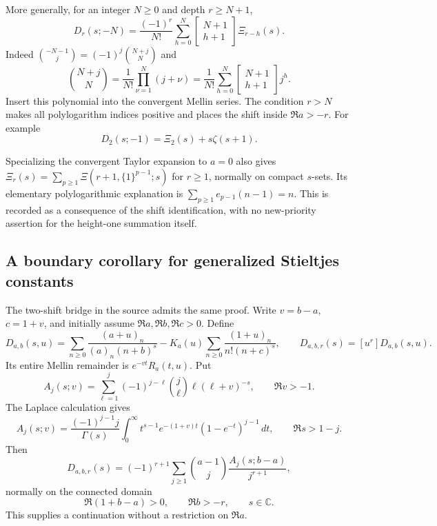 \documentclass[11pt,a4paper]{article}
\numberwithin{equation}{section}
\theoremstyle{definition}
\theoremstyle{remark}
\begin{document}
More generally, for an integer $N\ge0$ and depth $r\ge N+1$,
\begin{equation}\label{hn:eq:negative-shifts}
 D_r(s;-N)=\frac{(-1)^r}{N!}\sum_{h=0}^N
     \left[\begin{matrix}N+1\\h+1\end{matrix}\right]\Xi_{r-h}(s).
\end{equation}
Indeed $\binom{-N-1}{j}=(-1)^j\binom{N+j}{N}$ and
\[
 \binom{N+j}{N}=\frac1{N!}\prod_{\nu=1}^N(j+\nu)
   =\frac1{N!}\sum_{h=0}^N
       \left[\begin{matrix}N+1\\h+1\end{matrix}\right]j^h.
\]
Insert this polynomial into the convergent Mellin series. The
condition $r>N$ makes all polylogarithm indices positive and
places the shift inside $\Re a>-r$. For example
\[
                   D_2(s;-1)=\Xi_2(s)+s\zeta(s+1).
\]

Specializing the convergent Taylor expansion to $a=0$ also gives
$\Xi_r(s)=\sum_{p\ge1}\Xi(r+1,\{1\}^{p-1};s)$ for $r\ge1$,
normally on compact $s$-sets. Its elementary polylogarithmic
explanation is $\sum_{p\ge1}e_{p-1}(n-1)=n$.
This is recorded as a consequence of the shift identification,
with no new-priority assertion for the height-one summation itself.

\subsection{A boundary corollary for generalized Stieltjes constants}

The two-shift bridge in the source admits the same proof. Write
$v=b-a$, $c=1+v$, and initially assume $\Re a,\Re b,\Re c>0$.
Define
\[
 D_{a,b}(s,u)=\sum_{n\ge0}\frac{(a+u)_n}{(a)_n(n+b)^s}
   -K_a(u)\sum_{n\ge0}\frac{(1+u)_n}{n!(n+c)^s},
 \qquad D_{a,b,r}(s)=[u^r]D_{a,b}(s,u).
\]
Its entire Mellin remainder is $e^{-vt}R_a(t,u)$.
Put
\[
 A_j(s;v)=\sum_{\ell=1}^j(-1)^{j-\ell}\binom j\ell
                     \ell(\ell+v)^{-s},\qquad \Re v>-1.
\]
The Laplace calculation gives
\[
 A_j(s;v)=\frac{(-1)^{j-1}j}{\Gamma(s)}
       \int_0^\infty t^{s-1}e^{-(1+v)t}(1-e^{-t})^{j-1}\,dt,
 \qquad \Re s>1-j.
\]
Then
\begin{equation}\label{hn:eq:twodepth}
 D_{a,b,r}(s)=(-1)^{r+1}\sum_{j\ge1}\binom{a-1}{j}
                           \frac{A_j(s;b-a)}{j^{r+1}},
\end{equation}
normally on the connected domain
\begin{equation}\label{hn:eq:two-domain}
              \Re(1+b-a)>0,\qquad \Re b>-r,\qquad s\in\mathbb C.
\end{equation}
This supplies a continuation without a restriction on $\Re a$.
\end{document}

